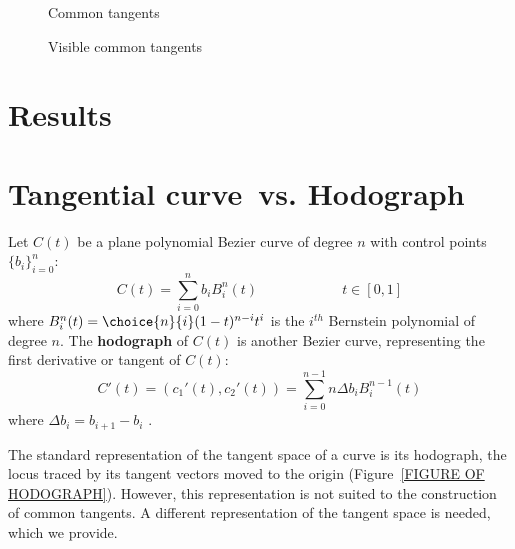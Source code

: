 \documentclass[11pt]{article}
\newcommand{\Tang}{Tangential curve\ }
\begin{document}
\begin{figure}
\vspace{2in}
\caption{Common tangents}
\label{fig:alg4}
\end{figure}

\begin{figure}
\vspace{2in}
\caption{Visible common tangents}
\label{fig:alg5}
\end{figure}

\clearpage
\onecolumn

\section{Results}
\label{sec:results}



\section{\Tang vs. Hodograph}
\label{sec:hodo}

Let $C(t)$ be a plane polynomial Bezier curve of degree $n$
with control points $\{b_i\}_{i=0}^n$:
\[
C(t) = \sum_{i=0}^n b_i B_i^n(t)
\hspace{1in} t \in [0,1]
\]
where $B_i^n(t) = \choice{n}{i} (1-t)^{n-i} t^i$ is the $i^{th}$ Bernstein
polynomial of degree $n$.
The {\bf hodograph} of $C(t)$ is another Bezier curve, representing
the first derivative or tangent of $C(t)$:
\[
C'(t) = (c_1'(t), c_2'(t)) = \sum_{i=0}^{n-1} n\Delta b_i B_i^{n-1}(t)
\]
where $\Delta b_i = b_{i+1} - b_i$ \cite{farin97}.

The standard representation of the tangent space of a curve
is its hodograph, the locus traced by its tangent vectors moved to the origin
(Figure~\ref{FIGURE OF HODOGRAPH}).
However, this representation is not suited to the construction
of common tangents.
A different representation of the tangent space is needed, 
which we provide.
\end{document}
